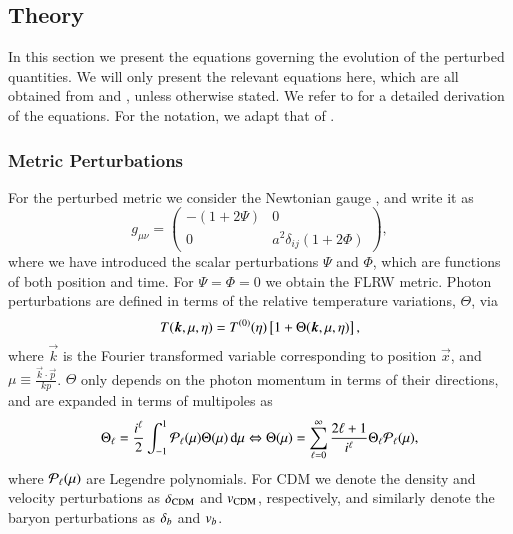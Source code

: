 \subsection{Theory}\label{ssec:M3:theory}
In this section we present the equations governing the evolution of the perturbed quantities. We will only present the relevant equations here, which are all obtained from \cite{Dodelson} and \cite{callin}, unless otherwise stated. We refer to \citeauthor{Dodelson} for a detailed derivation of the equations. For the notation, we adapt that of \citeauthor{callin}. 

\subsubsection{Metric Perturbations}\label{sssec:M3:theory:perturbations}
For the perturbed metric we consider the Newtonian gauge , and write it as  
\begin{equation} \label{eq:M3:theory:metric_perturbation}
    g_{\mu\nu} = 
    \begin{pmatrix}
        -(1+2\Psi) & 0 \\
        0 & a^2 \delta_{ij}(1+2\Phi)
    \end{pmatrix},
\end{equation}
where we have introduced the scalar perturbations $\Psi$ and $\Phi$, which are functions of both position and time. For $\Psi=\Phi=0$ we obtain the FLRW metric. Photon perturbations are defined in terms of the relative temperature variations, $\Theta$, via 
\begin{equation} \label{eq:M3:theory:temperature_fluctuations}
    T(\boldsymbol{k},\mu,\eta) = T^{(0)}(\eta)\left[ 1 + \Theta(\boldsymbol{k},\mu,\eta) \right],
\end{equation}  
where $\vec{k}$ is the Fourier transformed variable corresponding to position $\vec{x}$, and $\mu\equiv \frac{\vec{k}\cdot\vec{p}}{kp}$. $\Theta$ only depends on the photon momentum in terms of their directions, and are expanded in terms of multipoles as 
\begin{equation} \label{eq:M3:theory:theta_ell_multipolse_expansion}
    \Theta_\ell = \frac{i^\ell}{2}\int_{-1}^1 \mathcal{P}_\ell(\mu)\Theta(\mu)\,\dd\mu \Leftrightarrow \Theta(\mu) = \sum_{\ell=0}^{\infty}\frac{2\ell+1}{i^\ell}\Theta_\ell \mathcal{P}_\ell(\mu),
\end{equation}
where $\mathcal{P}_\ell(\mu)$ are Legendre polynomials.  For CDM we denote the density and velocity perturbations as $\delta_\mathrm{CDM}$ and $v_\mathrm{CDM}$, respectively, and similarly denote the baryon perturbations as $\delta_b$ and $v_b$.  

